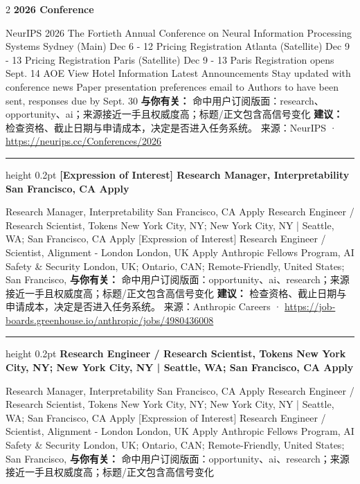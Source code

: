 \documentclass[10.5pt]{ctexart}
\begin{document}
\begin{multicols}{2}
{\large\bfseries 2026 Conference}\par
NeurIPS 2026 The Fortieth Annual Conference on Neural Information Processing Systems Sydney (Main) Dec 6 - 12 Pricing Registration Atlanta (Satellite) Dec 9 - 13 Pricing Registration Paris (Satellite) Dec 9 - 13 Paris Registration opens Sept. 14 AOE View Hotel Information Latest Announcements Stay updated with conference news Paper presentation preferences email to Authors to have been sent, responses due by Sept. 30
\textbf{与你有关：} 命中用户订阅版面：research、opportunity、ai；来源接近一手且权威度高；标题/正文包含高信号变化
\textbf{建议：} 检查资格、截止日期与申请成本，决定是否进入任务系统。
{\footnotesize\color{ormuted} 来源：NeurIPS · \url{https://neurips.cc/Conferences/2026}}
\vspace{2mm}
\hrule height 0.2pt
\vspace{2mm}
{\large\bfseries [Expression of Interest] Research Manager, Interpretability San Francisco, CA Apply}\par
[Expression of Interest] Research Manager, Interpretability San Francisco, CA Apply Research Engineer / Research Scientist, Tokens New York City, NY; New York City, NY | Seattle, WA; San Francisco, CA Apply [Expression of Interest] Research Engineer / Scientist, Alignment - London London, UK Apply Anthropic Fellows Program, AI Safety \& Security London, UK; Ontario, CAN; Remote-Friendly, United States; San Francisco, 
\textbf{与你有关：} 命中用户订阅版面：opportunity、ai、research；来源接近一手且权威度高；标题/正文包含高信号变化
\textbf{建议：} 检查资格、截止日期与申请成本，决定是否进入任务系统。
{\footnotesize\color{ormuted} 来源：Anthropic Careers · \url{https://job-boards.greenhouse.io/anthropic/jobs/4980436008}}
\vspace{2mm}
\hrule height 0.2pt
\vspace{2mm}
{\large\bfseries Research Engineer / Research Scientist, Tokens New York City, NY; New York City, NY | Seattle, WA; San Francisco, CA Apply}\par
[Expression of Interest] Research Manager, Interpretability San Francisco, CA Apply Research Engineer / Research Scientist, Tokens New York City, NY; New York City, NY | Seattle, WA; San Francisco, CA Apply [Expression of Interest] Research Engineer / Scientist, Alignment - London London, UK Apply Anthropic Fellows Program, AI Safety \& Security London, UK; Ontario, CAN; Remote-Friendly, United States; San Francisco, 
\textbf{与你有关：} 命中用户订阅版面：opportunity、ai、research；来源接近一手且权威度高；标题/正文包含高信号变化

\end{multicols}
\end{document}
